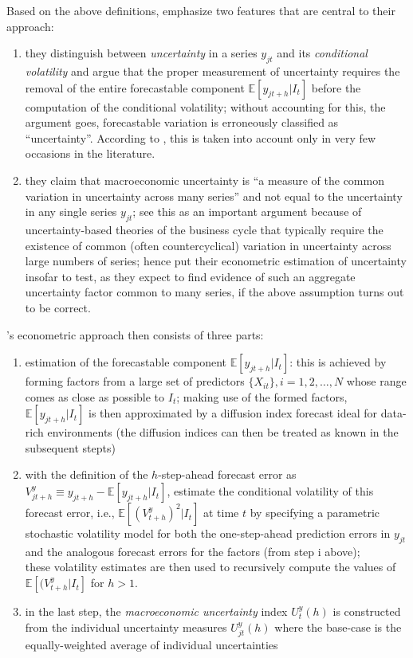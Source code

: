 \documentclass[a4paper,12pt,oneside,pointednumbers,bibtotoc,bigheadings,liststotoc]{scrbook}
\begin{document}
Based on the above definitions, \citet{juradoetal:15} emphasize two features that are central to their approach:
\begin{enumerate}
	\item they distinguish between \textit{uncertainty} in a series $y_{jt}$ and its \textit{conditional volatility} and argue that the proper measurement of uncertainty requires the removal of the entire forecastable component $\mathbb{E}[y_{jt+h}|I_t]$ before the computation of the conditional volatility; without accounting for this, the argument goes, forecastable variation is erroneously classified as ``uncertainty''. According to \citet{juradoetal:15}, this is taken into account only in very few occasions in the literature.
	\item they claim that macroeconomic uncertainty is ``a measure of the common variation in uncertainty across many series'' and not equal to the uncertainty in any single series $y_{jt}$; \citet{juradoetal:15} see this as an important argument because of uncertainty-based theories of the business cycle that typically require the existence of common (often countercyclical) variation in uncertainty across large numbers of series; \citet{juradoetal:15} hence put their econometric estimation of uncertainty insofar to test, as they expect to find evidence of such an aggregate uncertainty factor common to many series, if the above assumption turns out to be correct.
\end{enumerate}

\citet{juradoetal:15}'s econometric approach then consists of three parts:
\begin{enumerate}[i]
	\item estimation of the forecastable component $\mathbb{E}[y_{jt+h}|I_t]$: this is achieved by forming factors from a large set of predictors $\{X_{it}\}, i = 1, 2, \dots, N$ whose range comes as close as possible to $I_t$; making use of the formed factors, $\mathbb{E}[y_{jt+h}|I_t]$ is then approximated by a diffusion index forecast ideal for data-rich environments (the diffusion indices can then be treated as known in the subsequent stepts)
	\item with the definition of the $h$-step-ahead forecast error as $V_{jt+h}^y \equiv y_{jt+h} - \mathbb{E}[y_{jt+h}|I_t]$, \citet{juradoetal:15} estimate the conditional volatility of this forecast error, i.e., $\mathbb{E}[(V_{t+h}^y)^2|I_t]$ at time $t$ by specifying a parametric stochastic volatility model for both the one-step-ahead prediction errors in $y_{jt}$ and the analogous forecast errors for the factors (from step i above); \\
	these volatility estimates are then used to recursively compute the values of $\mathbb{E}[(V_{t+h}^y|I_t]$ for $h > 1$. 
	\item in the last step, the \textit{macroeconomic uncertainty} index $U_t^y(h)$ is constructed from the individual uncertainty measures $U_{jt}^y(h)$ where the base-case is the equally-weighted average of individual uncertainties
\end{enumerate}
\end{document}

